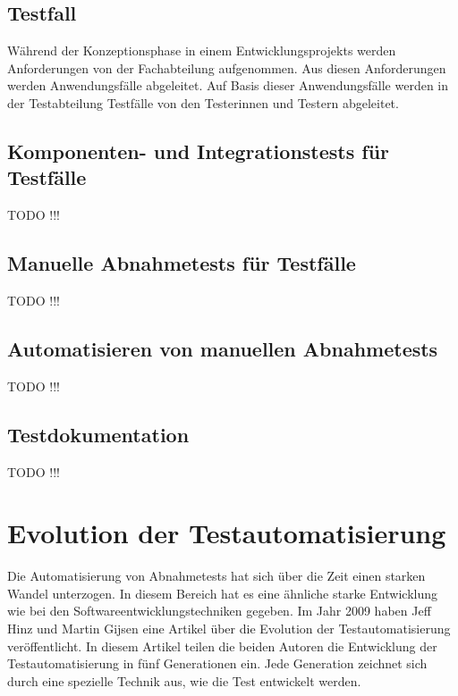 \subsection{Testfall}

Während der Konzeptionsphase in einem Entwicklungsprojekts werden Anforderungen von der Fachabteilung aufgenommen. Aus diesen Anforderungen werden Anwendungsfälle abgeleitet. Auf Basis dieser Anwendungsfälle werden in der Testabteilung Testfälle von den Testerinnen und Testern abgeleitet.

\todo

\subsection{Komponenten- und Integrationstests für Testfälle}

TODO !!!

\subsection{Manuelle Abnahmetests für Testfälle}

TODO !!!

\subsection{Automatisieren von manuellen Abnahmetests}

TODO !!!

\subsection{Testdokumentation}

TODO !!!

\section{Evolution der Testautomatisierung}

Die Automatisierung von Abnahmetests hat sich über die Zeit einen starken Wandel unterzogen. In diesem Bereich hat es eine ähnliche starke Entwicklung wie bei den Softwareentwicklungstechniken gegeben. Im Jahr 2009 haben Jeff Hinz und Martin Gijsen eine Artikel \cite{Hinz09} über die Evolution der Testautomatisierung veröffentlicht. In diesem Artikel teilen die beiden Autoren die Entwicklung der Testautomatisierung in fünf Generationen ein. Jede Generation zeichnet sich durch eine spezielle Technik aus, wie die Test entwickelt werden. 

